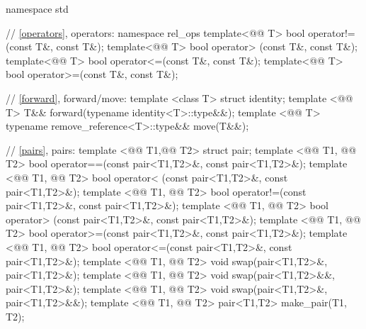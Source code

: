 \documentclass[american,twoside]{book}
\begin{document}
%
%

\begin{codeblock}
namespace std {
  // \ref{operators}, operators:
  namespace rel_ops {
    template<@@ T> bool operator!=(const T&, const T&);
    template<@@ T> bool operator> (const T&, const T&);
    template<@@ T> bool operator<=(const T&, const T&);
    template<@@ T> bool operator>=(const T&, const T&);
  }

  // \ref{forward}, forward/move:
  template <class T> struct identity;
  template <@@ T> T&& forward(typename identity<T>::type&&);
  template <@@ T> typename remove_reference<T>::type&& move(T&&);

  // \ref{pairs}, pairs:
  template <@@ T1,@@ T2> struct pair;
  template <@@ T1, @@ T2>
    bool operator==(const pair<T1,T2>&, const pair<T1,T2>&);
  template <@@ T1, @@ T2>
    bool operator< (const pair<T1,T2>&, const pair<T1,T2>&);
  template <@@ T1, @@ T2>
    bool operator!=(const pair<T1,T2>&, const pair<T1,T2>&);
  template <@@ T1, @@ T2>
    bool operator> (const pair<T1,T2>&, const pair<T1,T2>&);
  template <@@ T1, @@ T2>
    bool operator>=(const pair<T1,T2>&, const pair<T1,T2>&);
  template <@@ T1, @@ T2>
    bool operator<=(const pair<T1,T2>&, const pair<T1,T2>&);
  template <@@ T1, @@ T2> 
    void swap(pair<T1,T2>&, pair<T1,T2>&); 
  template <@@ T1, @@ T2> 
    void swap(pair<T1,T2>&&, pair<T1,T2>&);
  template <@@ T1, @@ T2> 
    void swap(pair<T1,T2>&, pair<T1,T2>&&); 
  template <@@ T1, @@ T2> pair<T1,T2> make_pair(T1, T2);
}
\end{codeblock}
\end{document}
